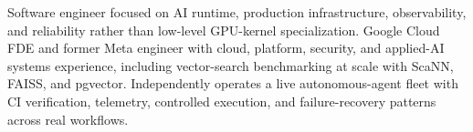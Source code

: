 


Software engineer focused on AI runtime, production infrastructure, observability, and reliability rather than low-level GPU-kernel specialization. Google Cloud FDE and former Meta engineer with cloud, platform, security, and applied-AI systems experience, including vector-search benchmarking at scale with ScaNN, FAISS, and pgvector. Independently operates a live autonomous-agent fleet with CI verification, telemetry, controlled execution, and failure-recovery patterns across real workflows.







